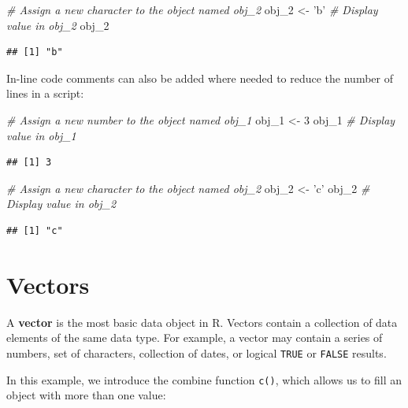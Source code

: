 \documentclass[]{book}
\newenvironment{Shaded}{\begin{snugshade}}{\end{snugshade}}
\newcommand{\CommentTok}[1]{\textcolor[rgb]{0.56,0.35,0.01}{\textit{#1}}}
\newcommand{\DecValTok}[1]{\textcolor[rgb]{0.00,0.00,0.81}{#1}}
\newcommand{\NormalTok}[1]{#1}
\newcommand{\StringTok}[1]{\textcolor[rgb]{0.31,0.60,0.02}{#1}}
\begin{document}
\begin{Shaded}
\begin{Highlighting}[]
\CommentTok{# Assign a new character to the object named obj_2}
\NormalTok{obj_}\DecValTok{2}\NormalTok{ <-}\StringTok{ 'b'}
\CommentTok{# Display value in obj_2}
\NormalTok{obj_}\DecValTok{2}
\end{Highlighting}
\end{Shaded}

\begin{verbatim}
## [1] "b"
\end{verbatim}

In-line code comments can also be added where needed to reduce the number of lines in a script:

\begin{Shaded}
\begin{Highlighting}[]
\CommentTok{# Assign a new number to the object named obj_1}
\NormalTok{obj_}\DecValTok{1}\NormalTok{ <-}\StringTok{ }\DecValTok{3}
\NormalTok{obj_}\DecValTok{1} \CommentTok{# Display value in obj_1}
\end{Highlighting}
\end{Shaded}

\begin{verbatim}
## [1] 3
\end{verbatim}

\begin{Shaded}
\begin{Highlighting}[]
\CommentTok{# Assign a new character to the object named obj_2}
\NormalTok{obj_}\DecValTok{2}\NormalTok{ <-}\StringTok{ 'c'} 
\NormalTok{obj_}\DecValTok{2} \CommentTok{# Display value in obj_2}
\end{Highlighting}
\end{Shaded}

\begin{verbatim}
## [1] "c"
\end{verbatim}

\hypertarget{vectors}{%
\section{Vectors}\label{vectors}}

A \textbf{vector} is the most basic data object in R. Vectors contain a collection of data elements of the same data type. For example, a vector may contain a series of numbers, set of characters, collection of dates, or logical \texttt{TRUE} or \texttt{FALSE} results.

In this example, we introduce the combine function \texttt{c()}, which allows us to fill an object with more than one value:
\end{document}
